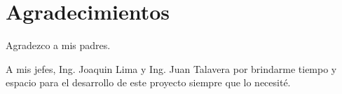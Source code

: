 \chapter*{Agradecimientos}

Agradezco a mis padres.

A mis jefes, Ing. Joaquin Lima y Ing. Juan Talavera por brindarme
tiempo y espacio para el desarrollo de este proyecto siempre que lo
necesité. 

